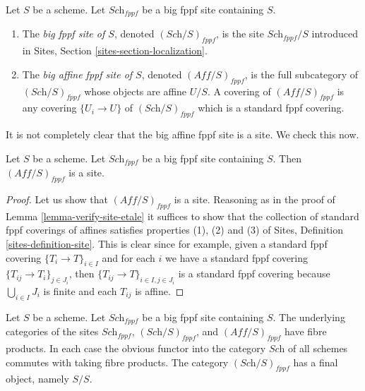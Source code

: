\begin{definition}
\label{definition-big-small-fppf}
Let $S$ be a scheme. Let $\textit{Sch}_{fppf}$ be a big fppf
site containing $S$.
\begin{enumerate}
\item The {\it big fppf site of $S$}, denoted
$(\textit{Sch}/S)_{fppf}$, is the site $\textit{Sch}_{fppf}/S$
introduced in Sites, Section \ref{sites-section-localization}.
\item The {\it big affine fppf site of $S$}, denoted
$(\textit{Aff}/S)_{fppf}$, is the full subcategory of
$(\textit{Sch}/S)_{fppf}$ whose objects are affine $U/S$.
A covering of $(\textit{Aff}/S)_{fppf}$ is any covering
$\{U_i \to U\}$ of $(\textit{Sch}/S)_{fppf}$ which is a
standard fppf covering.
\end{enumerate}
\end{definition}

\noindent
It is not completely clear that
the big affine fppf site is a site. We check this now.

\begin{lemma}
\label{lemma-verify-site-fppf}
Let $S$ be a scheme. Let $\textit{Sch}_{fppf}$ be a big fppf
site containing $S$. Then $(\textit{Aff}/S)_{fppf}$ is a site.
\end{lemma}

\begin{proof}
Let us show that $(\textit{Aff}/S)_{fppf}$ is a site.
Reasoning as in the proof of Lemma \ref{lemma-verify-site-etale}
it suffices to show that the collection
of standard fppf coverings of affines satisfies properties
(1), (2) and (3) of
Sites, Definition \ref{sites-definition-site}.
This is clear since for example, given a standard fppf
covering $\{T_i \to T\}_{i\in I}$ and for each
$i$ we have a standard fppf covering $\{T_{ij} \to T_i\}_{j\in J_i}$, then
$\{T_{ij} \to T\}_{i \in I, j\in J_i}$ is a standard fppf covering
because $\bigcup_{i\in I} J_i$ is finite and each $T_{ij}$ is affine.
\end{proof}

\begin{lemma}
\label{lemma-fibre-products-fppf}
Let $S$ be a scheme. Let $\textit{Sch}_{fppf}$ be a big fppf
site containing $S$. The underlying categories of the sites
$\textit{Sch}_{fppf}$, $(\textit{Sch}/S)_{fppf}$,
and $(\textit{Aff}/S)_{fppf}$ have fibre products.
In each case the obvious functor into the category $\textit{Sch}$ of
all schemes commutes with taking fibre products. The category
$(\textit{Sch}/S)_{fppf}$ has a final object, namely $S/S$.
\end{lemma}

